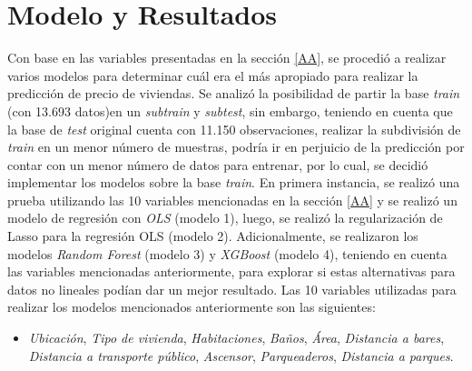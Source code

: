 \documentclass[conference, 10pt]{IEEEtran}
\begin{document}
\section{Modelo y Resultados}
Con base en las variables presentadas en la sección \ref{AA}, se procedió a realizar varios modelos para determinar cuál era el más apropiado para realizar la predicción de precio de viviendas. Se analizó la posibilidad de partir la base \textit{train} (con 13.693 datos)en un \textit{subtrain} y \textit{subtest}, sin embargo, teniendo en cuenta que la base de \textit{test} original cuenta con 11.150 observaciones, realizar la subdivisión de \textit{train} en un menor número de muestras, podría ir en perjuicio de la predicción por contar con un menor número de datos para entrenar, por lo cual, se decidió implementar los modelos sobre la base \textit{train}. En primera instancia, se realizó una prueba utilizando las 10 variables mencionadas en la sección \ref{AA} y se realizó un modelo de regresión con \textit{OLS} (modelo 1), luego, se realizó la regularización de Lasso para la regresión OLS (modelo 2). Adicionalmente, se realizaron los modelos \textit{Random Forest} (modelo 3) y \textit{XGBoost} (modelo 4), teniendo en cuenta las variables mencionadas anteriormente, para explorar si estas alternativas para datos no lineales podían dar un mejor resultado. Las 10 variables utilizadas para realizar los modelos mencionados anteriormente son las siguientes: 
\begin{itemize}
\item \textit{Ubicación}, \textit{Tipo de vivienda}, \textit{Habitaciones}, \textit{Baños}, \textit{Área}, \textit{Distancia a bares}, \textit{Distancia a transporte público}, \textit{Ascensor}, \textit{Parqueaderos}, \textit{Distancia a parques}.  
\end{itemize}
\end{document}

